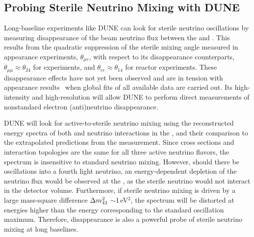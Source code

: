 \subsection{Probing Sterile Neutrino Mixing with DUNE}

    Long-baseline experiments like DUNE can look for sterile neutrino oscillations by measuring disappearance of the beam neutrino flux between the  and . This results from the quadratic suppression of the sterile mixing angle measured in appearance experiments, $\theta_{\mu e}$, with respect to its disappearance counterparts, $\theta_{\mu\mu}\approx\theta_{24}$ for  experiments, and $\theta_{ee}\approx\theta_{14}$ for reactor experiments. These disappearance effects have not yet been observed and are in tension with appearance results~\cite{ref:tension} when global fits of all available data are carried out. %
    Its high-intensity and high-resolution  will allow DUNE %
    to perform direct measurements of nonstandard electron (anti)neutrino disappearance. 

DUNE will look for active-to-sterile neutrino mixing using the reconstructed energy spectra of both   and   neutrino interactions  in the , and their comparison to the extrapolated predictions from the  measurement. Since  cross sections and interaction topologies are the same for all three active neutrino flavors, the  spectrum is insensitive to standard neutrino mixing. However, should there be oscillations into a fourth light neutrino, an energy-dependent depletion of the neutrino flux would be observed at the , as the sterile neutrino would not interact in the detector volume. Furthermore, if sterile neutrino mixing is driven by a large mass-square difference $\Delta m^2_{\rm{41}}$ $\sim$1\,eV$^{2}$, the  spectrum will be distorted at energies higher than the energy corresponding to the standard oscillation maximum. Therefore,  disappearance is also a powerful probe of sterile neutrino mixing at long baselines. 

